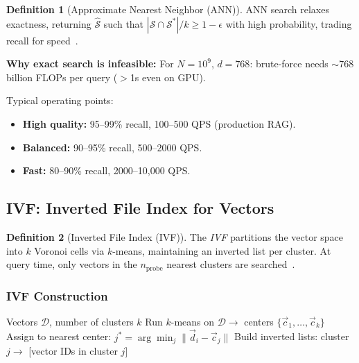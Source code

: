 \documentclass[11pt,a4paper]{article}
\theoremstyle{definition}
\newtheorem{definition}{Definition}[section]
\theoremstyle{plain}
\begin{document}
\begin{definition}[Approximate Nearest Neighbor (ANN)]
ANN search relaxes exactness, returning $\hat{\mathcal{S}}$ such that $|\hat{\mathcal{S}} \cap \mathcal{S}^*|/k \geq 1 - \epsilon$ with high probability, trading recall for speed~\cite{indyk1998approximate}.
\end{definition}

\textbf{Why exact search is infeasible:} For $N = 10^9$, $d = 768$: brute-force needs $\sim$768 billion FLOPs per query ($>$1s even on GPU).

\begin{center}

\end{center}

Typical operating points:
\begin{itemize}[nosep]
    \item \textbf{High quality:} 95--99\% recall, 100--500 QPS (production RAG).
    \item \textbf{Balanced:} 90--95\% recall, 500--2000 QPS.
    \item \textbf{Fast:} 80--90\% recall, 2000--10,000 QPS.
\end{itemize}

\subsection{IVF: Inverted File Index for Vectors}

\begin{definition}[Inverted File Index (IVF)]
The \emph{IVF} partitions the vector space into $k$ Voronoi cells via $k$-means, maintaining an inverted list per cluster. At query time, only vectors in the $n_{\mathrm{probe}}$ nearest clusters are searched~\cite{jegou2011product}.
\end{definition}

\begin{center}

\end{center}

\subsubsection{IVF Construction}

\begin{algorithm}[H]
\caption{IVF Construction}
\begin{algorithmic}[1]
\REQUIRE Vectors $\mathcal{D}$, number of clusters $k$
\STATE Run $k$-means on $\mathcal{D} \to$ centers $\{\vec{c}_1, \ldots, \vec{c}_k\}$
    \STATE Assign to nearest center: $j^* = \arg\min_j \|\vec{d}_i - \vec{c}_j\|$
\ENDFOR
\STATE Build inverted lists: cluster $j \to$ [vector IDs in cluster $j$]
\end{algorithmic}
\end{algorithm}
\end{document}

